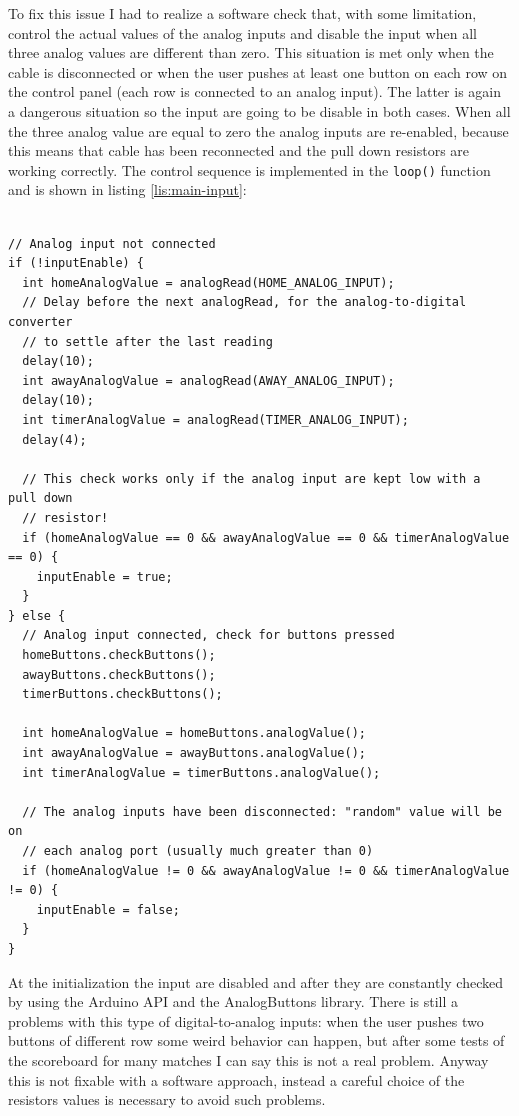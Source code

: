 \documentclass[11pt,english]{article}
\newcommand{\code}[1]{\texttt{#1}}
\begin{document}
To fix this issue I had to realize a software check that, with some limitation, control the actual values 
of the analog inputs and disable the input when all three analog values are different than zero. This 
situation is met only when the cable is disconnected or when the user pushes at least one button on each 
row on the control panel (each row is connected to an analog input). The latter is again a dangerous 
situation so the input are going to be disable in both cases.
When all the three analog value are equal to zero the analog inputs are re-enabled, because this means that 
cable has been reconnected and the pull down resistors are working correctly.
The control sequence is implemented in the \code{loop()} function and is shown in listing \ref{lis:main-input}:
%
\begin{lstlisting}[label=lis:main-input,caption=Main program from Arduino library]

// Analog input not connected
if (!inputEnable) {
  int homeAnalogValue = analogRead(HOME_ANALOG_INPUT);
  // Delay before the next analogRead, for the analog-to-digital converter
  // to settle after the last reading
  delay(10);
  int awayAnalogValue = analogRead(AWAY_ANALOG_INPUT);
  delay(10);
  int timerAnalogValue = analogRead(TIMER_ANALOG_INPUT);
  delay(4);

  // This check works only if the analog input are kept low with a pull down
  // resistor!
  if (homeAnalogValue == 0 && awayAnalogValue == 0 && timerAnalogValue == 0) {
    inputEnable = true;
  }
} else {
  // Analog input connected, check for buttons pressed
  homeButtons.checkButtons();
  awayButtons.checkButtons();
  timerButtons.checkButtons();

  int homeAnalogValue = homeButtons.analogValue();
  int awayAnalogValue = awayButtons.analogValue();
  int timerAnalogValue = timerButtons.analogValue();

  // The analog inputs have been disconnected: "random" value will be on
  // each analog port (usually much greater than 0)
  if (homeAnalogValue != 0 && awayAnalogValue != 0 && timerAnalogValue != 0) {
    inputEnable = false;
  }
}
\end{lstlisting}

At the initialization the input are disabled and after they are constantly checked by using the Arduino 
API and the AnalogButtons library.
There is still a problems with this type of digital-to-analog inputs: when the user pushes two buttons 
of different row some weird behavior can happen, but after some tests of the scoreboard for many matches I 
can say this is not a real problem. Anyway this is not fixable with a software approach, instead a careful
choice of the resistors values is necessary to avoid such problems. 
\end{document}
